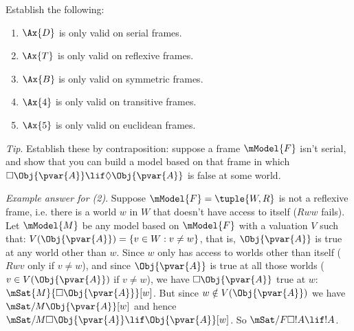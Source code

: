 \documentclass[../../../../include/open-logic-section]{subfiles}
\begin{document}
\begin{prob}
Establish the following:
\begin{enumerate}
	\item $\Ax{D}$ is only valid on serial frames. 
	\item $\Ax{T}$ is only valid on reflexive frames.
	\item $\Ax{B}$ is only valid on symmetric frames.
	\item $\Ax{4}$ is only valid on transitive frames. 
	\item $\Ax{5}$ is only valid on euclidean frames.
\end{enumerate}

\emph{Tip}. Establish these by contraposition: suppose a
frame $\mModel{F}$ isn't serial, and show that you can
build a model based on that frame in which $\Box \Obj{\pvar{A}} 
\lif \Diamond \Obj{\pvar{A}}$ is false at some world.

\emph{Example answer for (2)}. Suppose $\mModel{F}=\tuple{W,R}$ 
is not a reflexive frame, i.e. there is a world $w$ in $W$ 
that doesn't have access to itself ($Rww$ fails). Let 
$\mModel{M}$ be any model based on $\mModel{F}$ with a valuation
$V$ such that: $V(\Obj{\pvar{A}}) = \{v\in W: v \not= w\}$, 
that is, $\Obj{\pvar{A}}$ is true at any world other than $w$. Since
$w$ only has access to worlds other than itself ($Rwv$ only 
if $v \not= w$), and since $\Obj{\pvar{A}}$ is true at all those worlds 
($v\in V(\Obj{\pvar{A}})$ if $v \not= w$), we have $\Box \Obj{\pvar{A}}$ true
at $w$: $\mSat{M}{\Box \Obj{\pvar{A}}}[w]$. But since $w \notin V(\Obj{\pvar{A}})$
we have $\mSat/{M}{\Obj{\pvar{A}}}[w]$ and hence
 $\mSat/{M}{\Box \Obj{\pvar{A}} \lif \Obj{\pvar{A}}}[w]$. So $\mSat/{F}{\Box !A \lif !A}$.

\end{prob}
\end{document}
